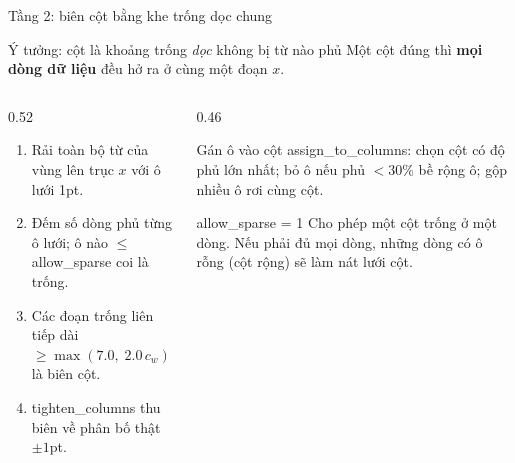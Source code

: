 \documentclass[aspectratio=169,11pt]{beamer}
\newcommand{\src}[1]{{\footnotesize\ttfamily #1}}
\begin{document}
\begin{frame}{Tầng 2: biên cột bằng khe trống dọc chung}
  \begin{block}{\small Ý tưởng: cột là khoảng trống \emph{dọc} không bị từ nào phủ}
    Một cột đúng thì \textbf{mọi dòng dữ liệu} đều hở ra ở cùng một đoạn $x$.
  \end{block}
  \begin{columns}[T]
    \begin{column}{0.52\textwidth}
      \begin{enumerate}\small
        \item Rải toàn bộ từ của vùng lên trục $x$ với ô lưới 1pt.
        \item Đếm số dòng phủ từng ô lưới; ô nào $\le$ \src{allow\_sparse} coi là trống.
        \item Các đoạn trống liên tiếp dài $\ge \max(7.0,\;2.0\,c_w)$ là biên cột.
        \item \src{tighten\_columns} thu biên về phân bố thật $\pm 1$pt.
      \end{enumerate}
    \end{column}
    \begin{column}{0.46\textwidth}
      \begin{block}{\small Gán ô vào cột}
        \src{assign\_to\_columns}: chọn cột có độ phủ lớn nhất; bỏ ô nếu phủ
        $< 30\%$ bề rộng ô; gộp nhiều ô rơi cùng cột.
      \end{block}
      \begin{alertblock}{\small \src{allow\_sparse = 1}}
        Cho phép một cột trống ở một dòng. Nếu phải đủ mọi dòng, những dòng có
        ô rỗng (cột rộng) sẽ làm nát lưới cột.
      \end{alertblock}
    \end{column}
  \end{columns}
\end{frame}
\end{document}
